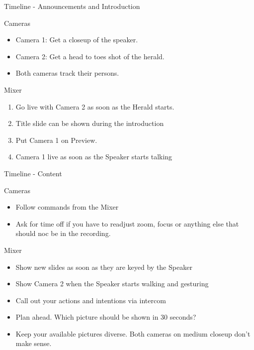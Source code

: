\documentclass[aspectratio=169]{beamer}
\begin{document}
\begin{frame}{Timeline - Announcements and Introduction}
	\begin{block}{Cameras}
		\begin{itemize}
			\item Camera 1: Get a closeup of the speaker.
			\item Camera 2: Get a head to toes shot of the herald.
			\item Both cameras track their persons.
		\end{itemize}
	\end{block}
	
	\begin{block}{Mixer}
		\begin{enumerate}
			\item Go live with Camera 2 as soon as the Herald starts.
			\item Title slide can be shown during the introduction 
			\item Put Camera 1 on Preview.
			\item Camera 1 live as soon as the Speaker starts talking
		\end{enumerate}
	\end{block}
\end{frame}

\begin{frame}{Timeline - Content}
	\begin{block}{Cameras}
		\begin{itemize}
			\item Follow commands from the Mixer
			\item Ask for time off if you have to readjust zoom, focus or anything else that should noc be in the recording.
		\end{itemize}
	\end{block}
	
	\begin{block}{Mixer}
		\begin{itemize}
			\item Show new slides as soon as they are keyed by the Speaker 
			\item Show Camera 2 when the Speaker starts walking and gesturing
			\item Call out your actions and intentions via intercom
			\item Plan ahead. Which picture should be shown in 30 seconds?
			\item Keep your available pictures diverse. Both cameras on medium closeup don't make sense.
		\end{itemize}
	\end{block}
\end{frame}
\end{document}
